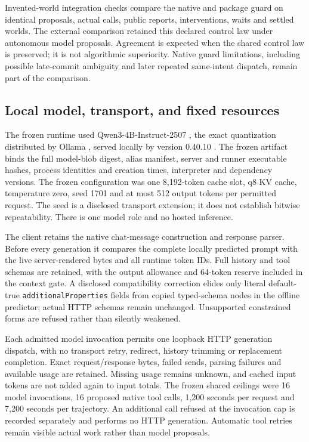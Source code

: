 Invented-world integration checks compare the native and package guard on
identical proposals, actual calls, public reports, interventions, waits and
settled worlds. The external comparison retained this declared
control law under autonomous model proposals. Agreement is expected when the
shared control law is preserved; it is not algorithmic superiority. Native
guard limitations, including possible late-commit ambiguity and later repeated
same-intent dispatch, remain part of the comparison.

\subsection{Local model, transport, and fixed resources}

The frozen runtime used Qwen3-4B-Instruct-2507 \cite{qwenmodel}, the exact
\texttt{} quantization distributed by
Ollama \cite{ollamaqwen}, served
locally by version 0.40.10 \cite{ollamaruntime}. The frozen artifact binds
the full model-blob digest, alias manifest, server and runner executable hashes,
process identities and creation times, interpreter and dependency versions.
The frozen configuration was one 8,192-token cache slot, q8 KV cache,
temperature zero, seed 1701 and at most 512 output tokens per permitted request.
The seed is a disclosed transport extension; it does not establish bitwise
repeatability. There is one model role and no hosted inference.

The client retains the native chat-message construction and response parser.
Before every generation it compares the complete locally predicted prompt with
the live server-rendered bytes and all runtime token IDs. Full history and tool
schemas are retained, with the output allowance and 64-token reserve included
in the context gate. A disclosed compatibility correction elides only literal
default-true \texttt{additionalProperties} fields from copied typed-schema
nodes in the offline predictor; actual HTTP schemas remain unchanged.
Unsupported constrained forms are refused rather than silently weakened.

Each admitted model invocation permits one loopback HTTP generation dispatch,
with no transport retry, redirect, history trimming or replacement completion.
Exact request/response bytes, failed sends, parsing failures and available usage
are retained. Missing usage remains unknown, and cached input tokens are not
added again to input totals. The frozen shared ceilings were 16 model
invocations, 16 proposed native tool calls, 1,200 seconds per request and
7,200 seconds per trajectory. An additional call refused at the invocation cap
is recorded separately and performs no HTTP generation. Automatic tool retries
remain visible actual work rather than model proposals.

